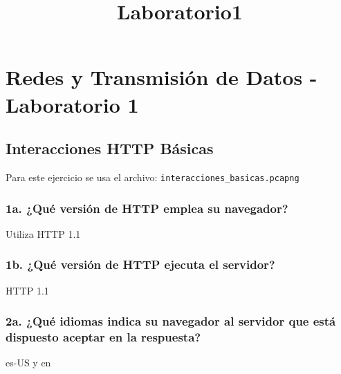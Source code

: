 \documentclass[11pt]{article}
\title{Laboratorio1}
\begin{document}
    
    
    \maketitle
    
    

    
    \hypertarget{redes-y-transmisiuxf3n-de-datos---laboratorio-1}{%
\section{Redes y Transmisión de Datos - Laboratorio
1}\label{redes-y-transmisiuxf3n-de-datos---laboratorio-1}}

    \hypertarget{interacciones-http-buxe1sicas}{%
\subsection{Interacciones HTTP
Básicas}\label{interacciones-http-buxe1sicas}}

    Para este ejercicio se usa el archivo:
\texttt{interacciones\_basicas.pcapng}

    \hypertarget{a.-quuxe9-versiuxf3n-de-http-emplea-su-navegador}{%
\subsubsection{1a. ¿Qué versión de HTTP emplea su
navegador?}\label{a.-quuxe9-versiuxf3n-de-http-emplea-su-navegador}}

Utiliza HTTP 1.1

\hypertarget{b.-quuxe9-versiuxf3n-de-http-ejecuta-el-servidor}{%
\subsubsection{1b. ¿Qué versión de HTTP ejecuta el
servidor?}\label{b.-quuxe9-versiuxf3n-de-http-ejecuta-el-servidor}}

HTTP 1.1

\hypertarget{a.-quuxe9-idiomas-indica-su-navegador-al-servidor-que-estuxe1-dispuesto-aceptar-en-la-respuesta}{%
\subsubsection{2a. ¿Qué idiomas indica su navegador al servidor que está
dispuesto aceptar en la
respuesta?}\label{a.-quuxe9-idiomas-indica-su-navegador-al-servidor-que-estuxe1-dispuesto-aceptar-en-la-respuesta}}

es-US y en
\end{document}
